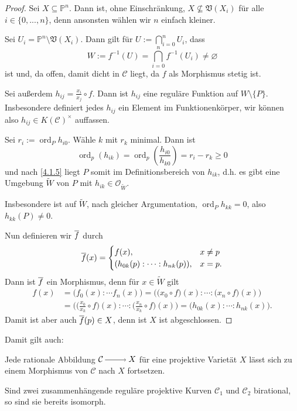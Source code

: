 \documentclass[a4paper,12pt]{scrbook}
\theoremstyle{keinenummern} %
\theoremstyle{mitnummern}
\theoremstyle{unserbeweis}
\newtheorem{proof}{Beweis}
\def\CC{\mathcal{C}}
\def\V{\mathfrak{V}}
\def\O{\mathcal{O}}
\def\P{\mathbb{P}}
\newcommand{\ord}{\operatorname{ord}}
\newcommand{\leer}{\ensuremath{\varnothing}}
\renewcommand{\dotsc}{\ensuremath{\!...}}
\newcommand{\ra}{\raisebox{-1pt}{\tikz{\draw[thin,shorten >=3pt, ->] (0,0) node{\hspace*{-2pt}} -- node{} (1,0);}}\penalty1000\relax}
\def\Bar#1{\ensuremath\overline{#1}}
\begin{document}
\begin{proof}
Sei $X\subseteq\P^{n}$. Dann ist, ohne Einschränkung, $X\not\subseteq\V(X_{i})$ für alle $i\in\{0,\dotsc,n\}$, denn ansonsten wählen wir $n$ einfach kleiner.

Sei $U_{i}=\P^{n}\setminus\V(X_{i})$. Dann gilt für $\displaystyle U:=\bigcap_{i=0}^{n}U_{i}$, dass
\[W:=f^{-1}(U)=\bigcap_{i=0}^{n}f^{-1}(U_{i})\neq\leer\]
ist und, da offen, damit dicht in $\CC$ liegt, da $f$ als Morphismus stetig ist.

Sei außerdem $h_{ij}=\frac{x_{i}}{x_{j}}\circ f$. Dann ist $h_{ij}$ eine reguläre Funktion auf $W\setminus\{P\}$. Insbesondere definiert jedes $h_{ij}$ ein Element im Funktionenkörper, wir können also $h_{ij}\in K(\CC)^{\times}$ auffassen.

Sei $r_{i}:=\ord_{P}h_{i0}$. Wähle $k$ mit $r_{k}$ minimal. Dann ist
\[\ord_{p}(h_{ik})=\ord_{p}\left(\frac{h_{i0}}{h_{k0}}\right)=r_{i}-r_{k}\geq 0\]
und nach \cref{4.1.5} liegt $P$ somit im Definitionsbereich von $h_{ik}$, d.h. es gibt eine Umgebung $\tilde{W}$ von $P$ mit $h_{ik}\in\O_{\tilde{W}}$.

Insbesondere ist auf $\tilde{W}$, nach gleicher Argumentation, $\ord_{P}h_{kk}=0$, also $h_{kk}(P)\neq 0$.

Nun definieren wir $\Bar{f}$ durch
\[\Bar{f}(x)=\begin{cases}f(x),&x\neq p\\(h_{0k}(p):\dotsm:h_{nk}(p)),&x=p.\end{cases}\]
Dann ist $\Bar{f}$ ein Morphismus, denn für $x\in\tilde{W}$ gilt
\begin{align*}
f(x)&=\bigl(f_{0}(x):\dotsm f_{n}(x)\bigr)=\bigl(\bigl(x_{0}\circ f\bigr)(x):\dotsm:\bigl(x_{n}\circ f\bigr)(x)\bigr)\\
&=\bigl(\bigl(\tfrac{x_{0}}{x_{k}}\circ f\bigr)(x):\dotsm:\bigl(\tfrac{x_{n}}{x_{k}}\circ f\bigr)(x)\bigr)=\bigl(h_{0k}(x):\dotsm:h_{nk}(x)\bigr).
\end{align*}
Damit ist aber auch $\Bar{f}(p)\in X$, denn ist $X$ ist abgeschlossen.
\end{proof}

Damit gilt auch:
\begin{kor}\label{4.1.7}
Jede rationale Abbildung $\CC\ra X$ für eine projektive Varietät $X$ lässt sich zu einem Morphismus von $\CC$ nach $X$ fortsetzen.
\end{kor}

\begin{kor}\label{4.1.8}
Sind zwei zusammenhängende reguläre projektive Kurven $\CC_{1}$ und $\CC_{2}$ birational, so sind sie bereits isomorph.
\end{kor}
\end{document}
